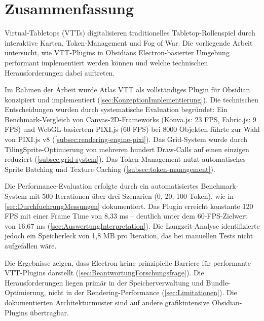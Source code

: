 \cleardoublepage
\chapter*{Zusammenfassung}

Virtual-Tabletops (VTTs) digitalisieren traditionelles Tabletop-Rollenspiel durch interaktive Karten, Token-Management und Fog of War. Die vorliegende Arbeit untersucht, wie VTT-Plugins in Obsidians Electron-basierter Umgebung performant implementiert werden können und welche technischen Herausforderungen dabei auftreten.

Im Rahmen der Arbeit wurde Atlas VTT als vollständiges Plugin für Obsidian konzipiert und implementiert (\autoref{sec:KonzeptionImplementierung}). Die technischen Entscheidungen wurden durch systematische Evaluation begründet: Ein Benchmark-Vergleich von Canvas-2D-Frameworks (Konva.js: 23 FPS, Fabric.js: 9 FPS) und WebGL-basiertem PIXI.js (60 FPS) bei 8000 Objekten führte zur Wahl von PIXI.js v8 (\autoref{subsec:rendering-engine-pixi}). Das Grid-System wurde durch TilingSprite-Optimierung von mehreren hundert Draw-Calls auf einen einzigen reduziert (\autoref{subsec:grid-system}). Das Token-Management nutzt automatisches Sprite Batching und Texture Caching (\autoref{subsec:token-management}).

Die Performance-Evaluation erfolgte durch ein automatisiertes Benchmark-System mit 500 Iterationen über drei Szenarien (0, 20, 100 Token), wie in \autoref{sec:DurchfuehrungMessungen} dokumentiert. Das Plugin erreicht konstante 120 FPS mit einer Frame Time von 8,33 ms -- deutlich unter dem 60-FPS-Zielwert von 16,67 ms (\autoref{sec:AuswertungInterpretation}). Die Langzeit-Analyse identifizierte jedoch ein Speicherleck von 1,8 MB pro Iteration, das bei manuellen Tests nicht aufgefallen wäre.

Die Ergebnisse zeigen, dass Electron keine prinzipielle Barriere für performante VTT-Plugins darstellt (\autoref{sec:BeantwortungForschungsfrage}). Die Herausforderungen liegen primär in der Speicherverwaltung und Bundle-Optimierung, nicht in der Rendering-Performance (\autoref{sec:Limitationen}). Die dokumentierten Architekturmuster sind auf andere grafikintensive Obsidian-Plugins übertragbar.

